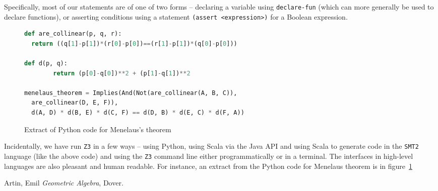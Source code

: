 \documentclass{amsart}
\theoremstyle{plain}
\theoremstyle{definition}
\theoremstyle{remark}
\begin{document}
Specifically, most of our statements are of one of two forms --
declaring a variable using \texttt{declare-fun} (which can more
generally be used to declare functions), or asserting conditions using a
statement \texttt{(assert\ <expression>)} for a
Boolean expression.

	{\small
		\begin{figure}
			\begin{lstlisting}[language=Python, frame=single]
def are_collinear(p, q, r):
  return ((q[1]-p[1])*(r[0]-p[0])==(r[1]-p[1])*(q[0]-p[0]))

def d(p, q):
        return (p[0]-q[0])**2 + (p[1]-q[1])**2

menelaus_theorem = Implies(And(Not(are_collinear(A, B, C)), 
  are_collinear(D, E, F)), 
  d(A, D) * d(B, E) * d(C, F) == d(D, B) * d(E, C) * d(F, A))
\end{lstlisting}
			\caption{Extract of Python code for Menelaus's theorem}\label{python-menelaus}
		\end{figure}
	}

Incidentally, we have run \texttt{Z3} in a few ways -- using Python, using Scala
via the Java API and using Scala to generate code in the \texttt{SMT2} language
(like the above code) and using the \texttt{Z3} command line either
programmatically or in a terminal. The interfaces in high-level
languages are also pleasant and human readable. For instance, an extract
from the Python code for Menelaus theorem is in figure~\ref{python-menelaus}



\begin{thebibliography}{10}

	 Artin, Emil
	\textit{Geometric Algebra},
	Dover.

\end{thebibliography} 
\end{document}

